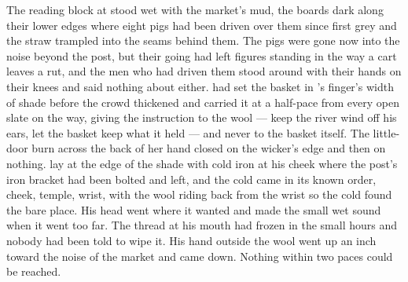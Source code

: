 
The reading block at  stood wet with the market's mud, the boards dark along their lower edges where eight pigs had been driven over them since first grey and the straw trampled into the seams behind them. The pigs were gone now into the noise beyond the post, but their going had left figures standing in the way a cart leaves a rut, and the men who had driven them stood around with their hands on their knees and said nothing about either.  had set the basket in 's finger's width of shade before the crowd thickened and carried it at a half-pace from every open slate on the way, giving the instruction to the wool --- keep the river wind off his ears, let the basket keep what it held --- and never to the basket itself. The little-door burn across the back of her hand closed on the wicker's edge and then on nothing.  lay at the edge of the shade with cold iron at his cheek where the post's iron bracket had been bolted and left, and the cold came in its known order, cheek, temple, wrist, with the wool riding back from the wrist so the cold found the bare place. His head went where it wanted and made the small wet sound when it went too far. The thread at his mouth had frozen in the small hours and nobody had been told to wipe it. His hand outside the wool went up an inch toward the noise of the market and came down. Nothing within two paces could be reached.


